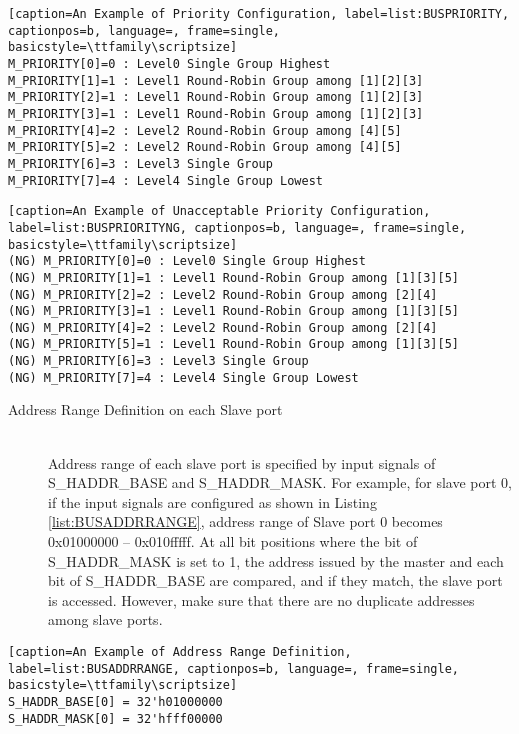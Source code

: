    \begin{lstlisting}[caption=An Example of Priority Configuration, label=list:BUSPRIORITY, captionpos=b, language=, frame=single, basicstyle=\ttfamily\scriptsize]
M_PRIORITY[0]=0 : Level0 Single Group Highest
M_PRIORITY[1]=1 : Level1 Round-Robin Group among [1][2][3]
M_PRIORITY[2]=1 : Level1 Round-Robin Group among [1][2][3]
M_PRIORITY[3]=1 : Level1 Round-Robin Group among [1][2][3]
M_PRIORITY[4]=2 : Level2 Round-Robin Group among [4][5]
M_PRIORITY[5]=2 : Level2 Round-Robin Group among [4][5]
M_PRIORITY[6]=3 : Level3 Single Group
M_PRIORITY[7]=4 : Level4 Single Group Lowest
    \end{lstlisting}

    \begin{lstlisting}[caption=An Example of Unacceptable Priority Configuration, label=list:BUSPRIORITYNG, captionpos=b, language=, frame=single, basicstyle=\ttfamily\scriptsize]
(NG) M_PRIORITY[0]=0 : Level0 Single Group Highest
(NG) M_PRIORITY[1]=1 : Level1 Round-Robin Group among [1][3][5]
(NG) M_PRIORITY[2]=2 : Level2 Round-Robin Group among [2][4]
(NG) M_PRIORITY[3]=1 : Level1 Round-Robin Group among [1][3][5]
(NG) M_PRIORITY[4]=2 : Level2 Round-Robin Group among [2][4]
(NG) M_PRIORITY[5]=1 : Level1 Round-Robin Group among [1][3][5]
(NG) M_PRIORITY[6]=3 : Level3 Single Group
(NG) M_PRIORITY[7]=4 : Level4 Single Group Lowest
    \end{lstlisting}

\begin{description}

    \item[Address Range Definition on each Slave port]\mbox{}\\
        Address range of each slave port is specified by input signals of S\_HADDR\_BASE and S\_HADDR\_MASK. For example, for slave port 0, if the input signals are configured as shown in Listing \ref{list:BUSADDRRANGE}, address range of Slave port 0 becomes 0x01000000 – 0x010fffff. At all bit positions where the bit of S\_HADDR\_MASK is set to 1, the address issued by the master and each bit of S\_HADDR\_BASE are compared, and if they match, the slave port is accessed. However, make sure that there are no duplicate addresses among slave ports.

\end{description}

    \begin{lstlisting}[caption=An Example of Address Range Definition, label=list:BUSADDRRANGE, captionpos=b, language=, frame=single, basicstyle=\ttfamily\scriptsize]
S_HADDR_BASE[0] = 32'h01000000
S_HADDR_MASK[0] = 32'hfff00000
    \end{lstlisting}

